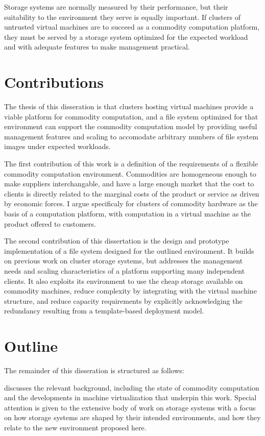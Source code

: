 Storage systems are normally measured by their performance, but their suitability to the environment they serve is equally important. If clusters of untrusted virtual machines are to succeed as a commodity computation platform, they must be served by a storage system optimized for the expected workload and with adequate features to make management practical.

\section{Contributions}

The thesis of this disseration is that clusters hosting virtual machines provide a viable platform for commodity computation, and a file system optimized for that environment can support the commodity computation model by providing useful management features and scaling to accomodate arbitrary numbers of file system images under expected workloads.

The first contribution of this work is a definition of the requirements of a flexible commodity computation environment. Commodities are homogeneous enough to make suppliers interchangable, and have a large enough market that the cost to clients is directly related to the marginal costs of the product or service as driven by economic forces. I argue specificaly for clusters of commodity hardware as the basis of a computation platform, with computation in a virtual machine as the product offered to customers.

The second contribution of this dissertation is the design and prototype implementation of a file system designed for the outlined environment. It builds on previous work on cluster storage systems, but addresses the management needs and scaling characteristics of a platform supporting many independent clients. It also exploits its environment to use the cheap storage available on commodity machines, reduce complexity by integrating with the virtual machine structure, and reduce capacity requirements by explicitly acknowledging the redundancy resulting from a template-based deployment model.

\section{Outline}

The remainder of this disseration is structured as follows:

 discusses the relevant background, including the state of commodity computation and the developments in machine virtualization that underpin this work. Special attention is given to the extensive body of work on storage systems with a focus on how storage systems are shaped by their intended environments, and how they relate to the new environment proposed here.


